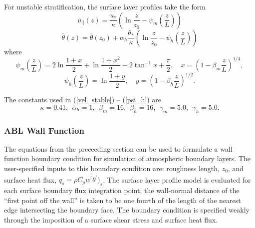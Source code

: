 For unstable stratification, the surface layer profiles take the form
\begin{equation} \label{vel_unstable}
  \overline{u}_{||}(z) = \frac{u_*}{\kappa}\left(\ln\frac{z}{z_0} -
  \psi_m\left(\frac{z}{L}\right)\right)
\end{equation}
\begin{equation} \label{temp_unstable}
  \overline{\theta}(z) = \overline{\theta}(z_0) +
  \alpha_h\frac{\theta_*}{\kappa}\left(\ln\frac{z}{z_0} -
  \psi_h\left(\frac{z}{L}\right)\right)
\end{equation}
where
\begin{equation} \label{psi_m}
 \psi_m\left(\frac{z}{L}\right) = 2\ln\frac{1 + x}{2} + \ln\frac{1 + x^2}{2} - 2\tan^{-1}x +
 \frac{\pi}{2}, \quad x = \left(1 - \beta_m\frac{z}{L}\right)^{1/4},
\end{equation}
\begin{equation} \label{psi_h}
 \psi_h\left(\frac{z}{L}\right) = \ln\frac{1 + y}{2}, \quad y = \left(1 -
 \beta_h\frac{z}{L}\right)^{1/2}.
\end{equation}

The constants used in (\ref{vel_stable}) -- (\ref{psi_h}) are \cite{Dyer:74}
\begin{equation}
  \kappa = 0.41,~~\alpha_h =
  1,~~\beta_m=16,~~\beta_h=16,~~\gamma_m=5.0,~~\gamma_h=5.0.
\end{equation}

\subsubsection{ABL Wall Function}
The equations from the preceeding section can be used to formulate a
wall function boundary condition for simulation of atmospheric
boundary layers.  The user-specified inputs to this boundary condition
are: roughness length, $z_0$, and surface heat flux, $q_s =
\rho C_p \overline{w^\prime \theta^\prime})_s$.  The surface layer profile
model is evaluated for each surface boundary flux integration point;
the wall-normal distance of the ``first point off the wall'' is taken
to be one fourth of the length of the nearest edge intersecting the
boundary face.  The boundary condition is specified weakly through the
imposition of a surface shear stress and surface heat flux.

